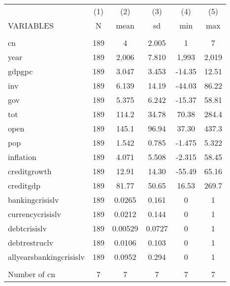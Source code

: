 \documentclass[]{article}
\begin{document}
\begin{tabular}{lccccc} \hline
 & (1) & (2) & (3) & (4) & (5) \\
VARIABLES & N & mean & sd & min & max \\ \hline
 &  &  &  &  &  \\
cn & 189 & 4 & 2.005 & 1 & 7 \\
year & 189 & 2,006 & 7.810 & 1,993 & 2,019 \\
gdpgpc & 189 & 3.047 & 3.453 & -14.35 & 12.51 \\
inv & 189 & 6.139 & 14.19 & -44.03 & 86.22 \\
gov & 189 & 5.375 & 6.242 & -15.37 & 58.81 \\
tot & 189 & 114.2 & 34.78 & 70.38 & 284.4 \\
open & 189 & 145.1 & 96.94 & 37.30 & 437.3 \\
pop & 189 & 1.542 & 0.785 & -1.475 & 5.322 \\
inflation & 189 & 4.071 & 5.508 & -2.315 & 58.45 \\
creditgrowth & 189 & 12.91 & 14.30 & -55.49 & 65.16 \\
creditgdp & 189 & 81.77 & 50.65 & 16.53 & 269.7 \\
bankingcrisislv & 189 & 0.0265 & 0.161 & 0 & 1 \\
currencycrisislv & 189 & 0.0212 & 0.144 & 0 & 1 \\
debtcrisislv & 189 & 0.00529 & 0.0727 & 0 & 1 \\
debtrestruclv & 189 & 0.0106 & 0.103 & 0 & 1 \\
allyearsbankingcrisislv & 189 & 0.0952 & 0.294 & 0 & 1 \\
 &  &  &  &  &  \\
 Number of cn & 7 & 7 & 7 & 7 & 7 \\ \hline
\end{tabular}
\end{document}
